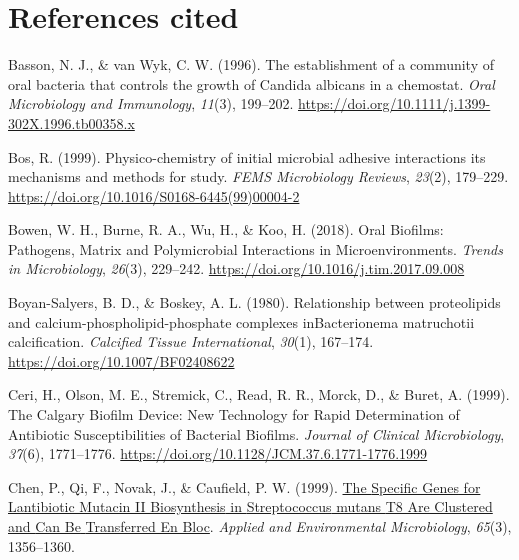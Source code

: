 \documentclass[
  b5paper,
]{book}
\newlength{\cslhangindent}
\newlength{\cslentryspacingunit} %
\newenvironment{CSLReferences}[2] %
 {%
  \setlength{\parindent}{0pt}
  \ifodd #1
  \let\oldpar\par
  \def\par{\hangindent=\cslhangindent\oldpar}
  \fi
  \setlength{\parskip}{#2\cslentryspacingunit}
 }%
 {}
\begin{document}
\hypertarget{references-cited-1}{%
\section*{References cited}\label{references-cited-1}}


\hypertarget{refs-2}{}
\begin{CSLReferences}{1}{0}
\leavevmode{}%
Basson, N. J., \& van Wyk, C. W. (1996). The establishment of a
community of oral bacteria that controls the growth of {Candida}
albicans in a chemostat. \emph{Oral Microbiology and Immunology},
\emph{11}(3), 199--202.
\url{https://doi.org/10.1111/j.1399-302X.1996.tb00358.x}

\leavevmode{}%
Bos, R. (1999). Physico-chemistry of initial microbial adhesive
interactions {\textendash} its mechanisms and methods for study.
\emph{FEMS Microbiology Reviews}, \emph{23}(2), 179--229.
\url{https://doi.org/10.1016/S0168-6445(99)00004-2}

\leavevmode{}%
Bowen, W. H., Burne, R. A., Wu, H., \& Koo, H. (2018). Oral {Biofilms}:
{Pathogens}, {Matrix} and {Polymicrobial Interactions} in
{Microenvironments}. \emph{Trends in Microbiology}, \emph{26}(3),
229--242. \url{https://doi.org/10.1016/j.tim.2017.09.008}

\leavevmode{}%
Boyan-Salyers, B. D., \& Boskey, A. L. (1980). Relationship between
proteolipids and calcium-phospholipid-phosphate complexes
{inBacterionema} matruchotii calcification. \emph{Calcified Tissue
International}, \emph{30}(1), 167--174.
\url{https://doi.org/10.1007/BF02408622}

\leavevmode{}%
Ceri, H., Olson, M. E., Stremick, C., Read, R. R., Morck, D., \& Buret,
A. (1999). The {Calgary Biofilm Device}: {New Technology} for {Rapid
Determination} of {Antibiotic Susceptibilities} of {Bacterial Biofilms}.
\emph{Journal of Clinical Microbiology}, \emph{37}(6), 1771--1776.
\url{https://doi.org/10.1128/JCM.37.6.1771-1776.1999}

\leavevmode{}%
Chen, P., Qi, F., Novak, J., \& Caufield, P. W. (1999).
\href{https://www.ncbi.nlm.nih.gov/pmc/articles/PMC91190}{The {Specific
Genes} for {Lantibiotic Mutacin II Biosynthesis} in {Streptococcus}
mutans {T8 Are Clustered} and {Can Be} {Transferred En Bloc}}.
\emph{Applied and Environmental Microbiology}, \emph{65}(3), 1356--1360.


\end{CSLReferences}
\end{document}

